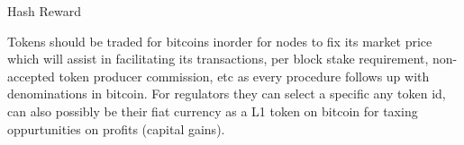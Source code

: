 \documentclass[a4paper,10pt,twocolumn]{article}
\begin{document}
\begin{algorithm}[H]
\SetAlgoLined
\scriptsize
\DontPrintSemicolon
\caption{Hash Reward}
\end{algorithm}

Tokens should be traded for bitcoins inorder for nodes to fix its market price which will assist in facilitating its transactions, per block stake requirement, non-accepted token producer commission, etc as every procedure follows up with denominations in bitcoin. For regulators they can select a specific any token id, can also possibly be their fiat currency as a L1 token on bitcoin for taxing oppurtunities on profits (capital gains).


\begin{comment}


\begin{algorithm}[H]
\SetAlgoLined
\scriptsize
\DontPrintSemicolon
\caption{Staking}
\end{algorithm}

\begin{algorithm}[H]
\SetAlgoLined
\scriptsize
\DontPrintSemicolon
\caption{Regulation}
\end{algorithm}


\begin{algorithm}[H]
\SetAlgoLined
\scriptsize
\DontPrintSemicolon
\caption{Taxes}
\end{algorithm}

\begin{algorithm}[H]
\SetAlgoLined
\scriptsize
\DontPrintSemicolon
\caption{Regulator Script}
\end{algorithm}

\begin{algorithm}[H]
\SetAlgoLined
\scriptsize
\DontPrintSemicolon
\caption{Swap Script}
\end{algorithm}

\begin{algorithm}[H]
\SetAlgoLined
\scriptsize
\DontPrintSemicolon
\caption{Exchange Rate}
\end{algorithm}

\begin{algorithm}[H]
\SetAlgoLined
\scriptsize
\DontPrintSemicolon
\caption{DAO Contracts}
\end{algorithm}

\end{comment}
\end{document}
